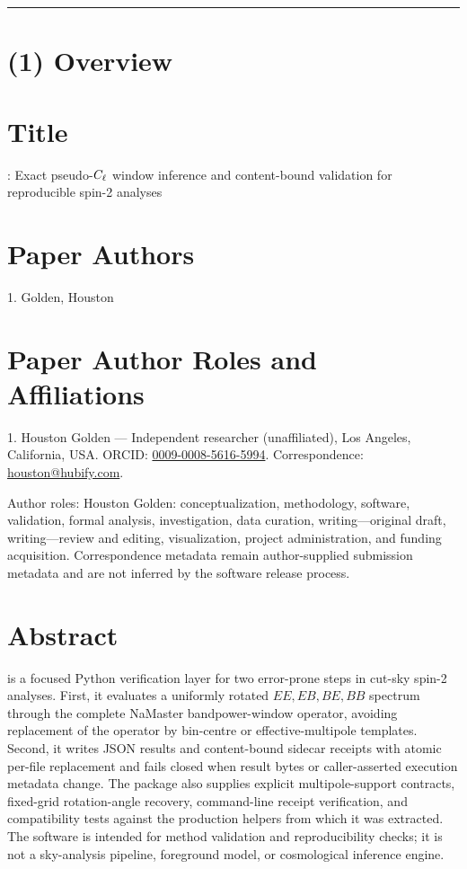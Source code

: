\rule{\textwidth}{1pt}

\section*{(1) Overview}

\vspace{0.5cm}

\section*{Title}

\software: Exact pseudo-\(C_\ell\) window inference and content-bound validation
for reproducible spin-2 analyses

\section*{Paper Authors}

1. Golden, Houston

\section*{Paper Author Roles and Affiliations}

1. Houston Golden --- Independent researcher (unaffiliated), Los Angeles,
California, USA. ORCID:
\href{https://orcid.org/0009-0008-5616-5994}{0009-0008-5616-5994}.
Correspondence: \href{mailto:houston@hubify.com}{houston@hubify.com}.

Author roles: Houston Golden: conceptualization, methodology, software,
validation, formal analysis, investigation, data curation,
writing---original draft, writing---review and editing, visualization, project
administration, and funding acquisition. Correspondence metadata remain
author-supplied submission metadata and are not inferred by the software
release process.

\section*{Abstract}

\software{} is a focused Python verification layer for two error-prone steps
in cut-sky spin-2 analyses.  First, it evaluates a uniformly rotated
\(EE,EB,BE,BB\) spectrum through the complete NaMaster bandpower-window
operator, avoiding replacement of the operator by bin-centre or
effective-multipole templates.  Second, it writes JSON results and
content-bound sidecar receipts with atomic per-file replacement and fails
closed when result bytes or caller-asserted execution metadata change.  The package also supplies explicit
multipole-support contracts, fixed-grid rotation-angle recovery, command-line
receipt verification, and compatibility tests against the production helpers
from which it was extracted.  The software is intended for method validation
and reproducibility checks; it is not a sky-analysis pipeline, foreground
model, or cosmological inference engine.

